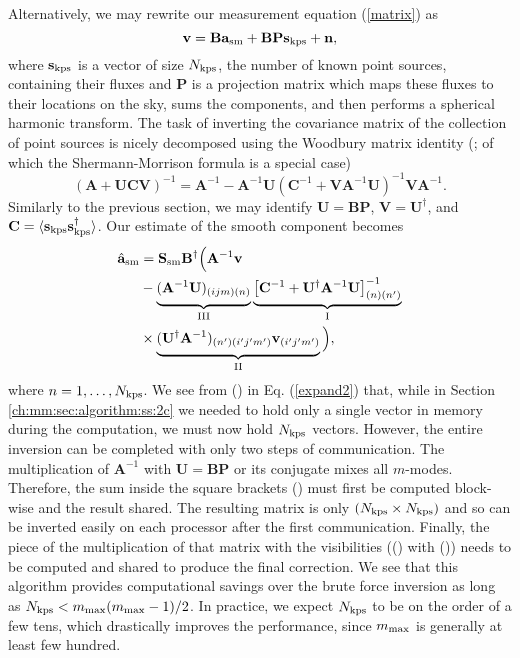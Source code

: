 Alternatively, we may rewrite our measurement equation (\ref{matrix}) as
\begin{equation}
\mathbf{v} =\mathbf{B}\mathbf{a}_{\rm sm} + \mathbf{B}\mathbf{P}\mathbf{s}_{\rm kps}  + \mathbf{n},
\end{equation}
where $\mathbf{s}_{\rm kps}$ is a vector of size $N_{\rm kps}$, the number of known point sources, containing their fluxes and $\mathbf{P}$ is a projection matrix which maps these fluxes to their locations on the sky, sums the components, and then performs a spherical harmonic transform. The task of inverting the covariance matrix of the collection of point sources is nicely decomposed using the Woodbury matrix identity (\citealp{woodbury}; of which the Shermann-Morrison formula is a special case)
\begin{equation}
(\mathbf{A}+\mathbf{U}\mathbf{C}\mathbf{V})^{-1}=\mathbf{A}^{-1}-\mathbf{A}^{-1}\mathbf{U}(\mathbf{C}^{-1}+\mathbf{V}\mathbf{A}^{-1}\mathbf{U})^{-1}\mathbf{V}\mathbf{A}^{-1}.
\label{woodbury}
\end{equation}
Similarly to the previous section, we may identify $\mathbf{U} = \mathbf{B}\mathbf{P}$, $\mathbf{V} = \mathbf{U}^\dagger$, and $\mathbf{C} = \langle \mathbf{s}_{\rm kps}\mathbf{s}_{\rm kps}^{\dagger} \rangle$. Our estimate of the smooth component becomes
\begin{align}
\hat{\mathbf{a}}_{\rm sm} &=  \mathbf{S}_{\rm sm}\mathbf{B}^{\dagger}\Big( \mathbf{A}^{-1}\mathbf{v}
\nonumber \\
 &-  \underbrace{\vphantom{\big]^{-1}_{(n)(n')}}(\mathbf{A}^{-1}\mathbf{U})_{(ijm)(n)}}_{\text{\RNum{3}}}
 \underbrace{\big[\mathbf{C}^{-1}
+\mathbf{U}^\dagger\mathbf{A}^{-1}\mathbf{U}\big]^{-1}_{(n)(n')}}_{\text{\RNum{1}}}
\nonumber \\
&\times
\underbrace{\vphantom{\big]^{-1}_{(n)(n')}}(\mathbf{U}^{\dagger}\mathbf{A}^{-1})_{(n')(i'j'm')}\mathbf{v}_{(i'j'm')}}_{\text{\RNum{2}}} \Big),
\label{expand2}
\end{align}
where $n=1,\dots,N_{\rm kps}$. We see from () in Eq. (\ref{expand2}) that, while in Section \ref{ch:mm:sec:algorithm:ss:2c} we needed to hold only a single vector in memory during the computation, we must now hold $N_{\rm kps}$ vectors. However, the entire inversion can be completed with only two steps of communication. The multiplication of $\mathbf{A}^{-1}$ with $\mathbf{U}=\mathbf{B}\mathbf{P}$ or its conjugate mixes all $m$-modes. Therefore, the sum inside the square brackets () must first be computed block-wise and the result shared. The resulting matrix is only $(N_{\rm kps} \times N_{\rm kps})$ and so can be inverted easily on each processor after the first communication. Finally, the piece of the multiplication of that matrix with the visibilities (() with ()) needs to be computed and shared to produce the final correction. We see that this algorithm provides computational savings over the brute force inversion as long as $N_{\rm kps} < m_{\rm max}(m_{\rm max} - 1)/2$. In practice, we expect $N_{\rm kps}$ to be on the order of a few tens, which drastically improves the performance, since $m_{\rm max}$ is generally at least few hundred.
